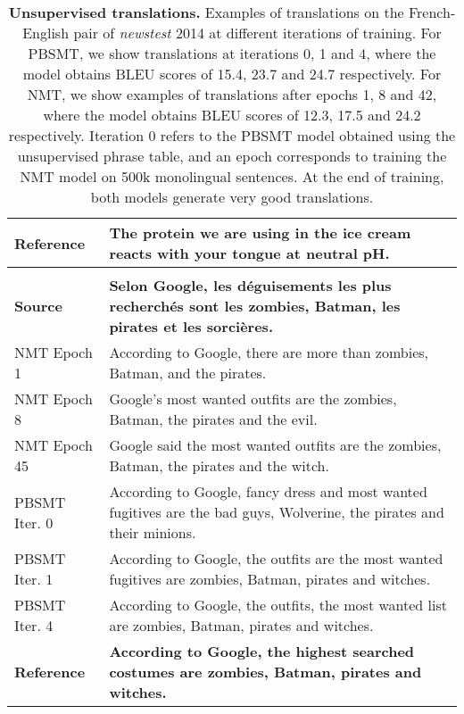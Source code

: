 \documentclass[11pt,a4paper]{article}
\begin{document}
{\begin{table*}[p]
{\begin{tabular}{ll}
        \midrule
        \bf Reference & \bf The protein we are using in the ice cream reacts with your tongue at neutral pH. \\
        \midrule
        \\
        \midrule
        \bf Source & \bf Selon Google, les déguisements les plus recherchés sont les zombies, Batman, les pirates et les sorcières. \\
        \midrule
        NMT Epoch 1 & According to Google, there are more than zombies, Batman, and the pirates. \\
        NMT Epoch 8 & Google's most wanted outfits are the zombies, Batman, the pirates and the evil. \\
        NMT Epoch 45 & Google said the most wanted outfits are the zombies, Batman, the pirates and the witch. \\
        \midrule
        PBSMT Iter. 0 & According to Google, fancy dress and most wanted fugitives are the bad guys, Wolverine, the pirates and their minions. \\
        PBSMT Iter. 1 & According to Google, the outfits are the most wanted fugitives are zombies, Batman, pirates and witches. \\
        PBSMT Iter. 4 & According to Google, the outfits, the most wanted list are zombies, Batman, pirates and witches. \\
        \midrule
        \bf Reference & \bf According to Google, the highest searched costumes are zombies, Batman, pirates and witches. \\ 
        \bottomrule
        \end{tabular}
        \smallskip
    }
    \caption{\small \textbf{Unsupervised translations.} Examples of translations on the French-English pair of \textit{newstest} 2014 at different iterations of training. For PBSMT, we show translations at iterations 0, 1 and 4, where the model obtains BLEU scores of 15.4, 23.7 and 24.7 respectively. For NMT, we show examples of translations after epochs 1, 8 and 42, where the model obtains BLEU scores of 12.3, 17.5 and 24.2 respectively. Iteration 0 refers to the PBSMT model obtained using the unsupervised phrase table, and an epoch corresponds to training the NMT model on 500k monolingual sentences. At the end of training, both models generate very good translations.
    \label{tab:translations}}
    \end{table*}
}
\end{document}
